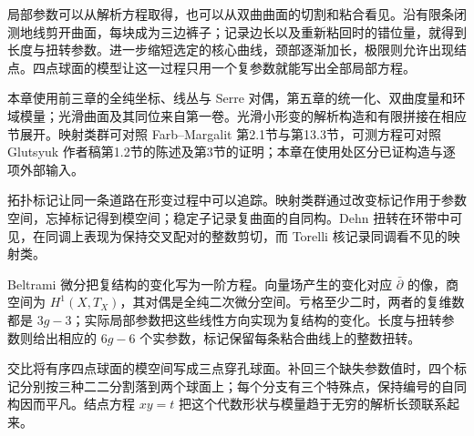 \ProseParagraphBreak

局部参数可以从解析方程取得，也可以从双曲曲面的切割和粘合看见。沿有限条闭测地线剪开曲面，每块成为三边裤子；记录边长以及重新粘回时的错位量，就得到长度与扭转参数。进一步缩短选定的核心曲线，颈部逐渐加长，极限则允许出现结点。四点球面的模型让这一过程只用一个复参数就能写出全部局部方程。

\ProseParagraphBreak

本章使用前三章的全纯坐标、线丛与 Serre 对偶，第五章的统一化、双曲度量和环域模量；光滑曲面及其同位来自第一卷。光滑小形变的解析构造和有限拼接在相应节展开。映射类群可对照 Farb--Margalit 第2.1节与第13.3节，可测方程可对照 Glutsyuk 作者稿第1.2节的陈述及第3节的证明；本章在使用处区分已证构造与逐项外部输入。\cite[第2.1、13.3节]{FarbMargalit2012Primer}\cite[作者稿第1.2、3节]{Glutsyuk2008Uniformization}







\begin{chaptersummary}
拓扑标记让同一条道路在形变过程中可以追踪。映射类群通过改变标记作用于参数空间，忘掉标记得到模空间；稳定子记录复曲面的自同构。Dehn 扭转在环带中可见，在同调上表现为保持交叉配对的整数剪切，而 Torelli 核记录同调看不见的映射类。

\ProseParagraphBreak

Beltrami 微分把复结构的变化写为一阶方程。向量场产生的变化对应 \(\bar\partial\) 的像，商空间为 \(H^1(X,T_X)\)，其对偶是全纯二次微分空间。亏格至少二时，两者的复维数都是 \(3g-3\)；实际局部参数把这些线性方向实现为复结构的变化。长度与扭转参数则给出相应的 \(6g-6\) 个实参数，标记保留每条粘合曲线上的整数扭转。

\ProseParagraphBreak

交比将有序四点球面的模空间写成三点穿孔球面。补回三个缺失参数值时，四个标记分别按三种二二分割落到两个球面上；每个分支有三个特殊点，保持编号的自同构因而平凡。结点方程 \(xy=t\) 把这个代数形状与模量趋于无穷的解析长颈联系起来。
\end{chaptersummary}

